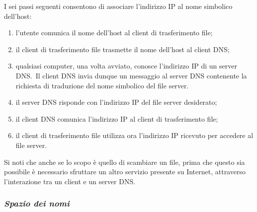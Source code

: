 I sei passi seguenti consentono di associare l'indirizzo IP al nome simbolico dell'host:

\begin{enumerate}
    \item l'utente comunica il nome dell'host al client di trasferimento file;
    \item il client di trasferimento file trasmette il nome dell'host al client DNS;
    \item qualsiasi computer, una volta avviato, conosce l'indirizzo IP di un server DNS.\ Il client DNS invia dunque un messaggio al server DNS contenente la richiesta di traduzione del nome simbolico del file server.
    \item il server DNS risponde con l'indirizzo IP del file server desiderato;
    \item il client DNS comunica l'indirizzo IP al client di trasferimento file;
    \item il client di trasferimento file utilizza ora l'indirizzo IP ricevuto per accedere al file server.
\end{enumerate}

Si noti che anche se lo scopo è quello di scambiare un file, prima che questo sia possibile è necessario sfruttare un altro servizio presente su Internet, attraverso l'interazione tra un client e un server DNS.

\subsubsection{\emph{Spazio dei nomi}}

